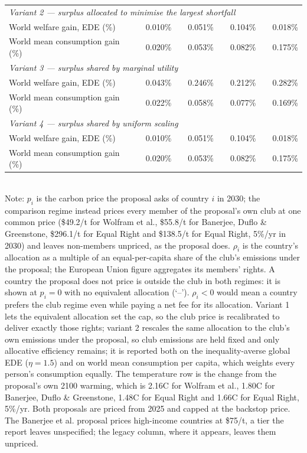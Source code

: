 \begin{table}[htbp]
\begin{tabular}{lcccccccc}
  \midrule
  \multicolumn{9}{l}{\textit{Variant 2 --- surplus allocated to minimise the largest shortfall}} \\
  \quad World welfare gain, EDE (\%) &  & 0.010\% &  & 0.051\% &  & 0.104\% &  & 0.018\% \\
  \quad World mean consumption gain (\%) &  & 0.020\% &  & 0.053\% &  & 0.082\% &  & 0.175\% \\
  \midrule
  \multicolumn{9}{l}{\textit{Variant 3 --- surplus shared by marginal utility}} \\
  \quad World welfare gain, EDE (\%) &  & 0.043\% &  & 0.246\% &  & 0.212\% &  & 0.282\% \\
  \quad World mean consumption gain (\%) &  & 0.022\% &  & 0.058\% &  & 0.077\% &  & 0.169\% \\
  \midrule
  \multicolumn{9}{l}{\textit{Variant 4 --- surplus shared by uniform scaling}} \\
  \quad World welfare gain, EDE (\%) &  & 0.010\% &  & 0.051\% &  & 0.104\% &  & 0.018\% \\
  \quad World mean consumption gain (\%) &  & 0.020\% &  & 0.053\% &  & 0.082\% &  & 0.175\% \\
  \bottomrule
\end{tabular}
\label{tab:equiv_rights_A}
\\[4pt]
{\footnotesize Note: $p_i$ is the carbon price the proposal asks of country $i$ in 2030; the comparison regime instead prices every member of the proposal's own club at one common price (\$49.2/t for Wolfram et al., \$55.8/t for Banerjee, Duflo \& Greenstone, \$296.1/t for Equal Right and \$138.5/t for Equal Right, 5\%/yr in 2030) and leaves non-members unpriced, as the proposal does. $\rho_i$ is the country's allocation as a multiple of an equal-per-capita share of the club's emissions under the proposal; the European Union figure aggregates its members' rights. A country the proposal does not price is outside the club in both regimes: it is shown at $p_i=0$ with no equivalent allocation (`--'). $\rho_i < 0$ would mean a country prefers the club regime even while paying a net fee for its allocation. Variant 1 lets the equivalent allocation set the cap, so the club price is recalibrated to deliver exactly those rights; variant 2 rescales the same allocation to the club's own emissions under the proposal, so club emissions are held fixed and only allocative efficiency remains; it is reported both on the inequality-averse global EDE ($\eta=1.5$) and on world mean consumption per capita, which weights every person's consumption equally. The temperature row is the change from the proposal's own 2100 warming, which is 2.16\textdegree{}C for Wolfram et al., 1.80\textdegree{}C for Banerjee, Duflo \& Greenstone, 1.48\textdegree{}C for Equal Right and 1.66\textdegree{}C for Equal Right, 5\%/yr. Both proposals are priced from 2025 and capped at the backstop price. The Banerjee et al. proposal prices high-income countries at \$75/t, a tier the report leaves unspecified; the legacy column, where it appears, leaves them unpriced.}
\end{table}
